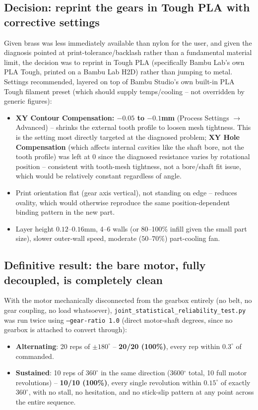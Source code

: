 \documentclass[11pt,letterpaper]{article}
\begin{document}
\subsection{Decision: reprint the gears in Tough PLA with corrective settings}
Given brass was less immediately available than nylon for the user, and given the diagnosis pointed at print-tolerance/backlash rather than a fundamental material limit, the decision was to reprint in Tough PLA (specifically Bambu Lab's own PLA Tough, printed on a Bambu Lab H2D) rather than jumping to metal. Settings recommended, layered on top of Bambu Studio's own built-in PLA Tough filament preset (which should supply temps/cooling -- not overridden by generic figures):
\begin{itemize}
    \item \textbf{XY Contour Compensation: $-0.05$ to $-0.1$mm} (Process Settings $\to$ Advanced) -- shrinks the external tooth profile to loosen mesh tightness. This is the setting most directly targeted at the diagnosed problem; \textbf{XY Hole Compensation} (which affects internal cavities like the shaft bore, not the tooth profile) was left at 0 since the diagnosed resistance varies by rotational position -- consistent with tooth-mesh tightness, not a bore/shaft fit issue, which would be relatively constant regardless of angle.
    \item Print orientation flat (gear axis vertical), not standing on edge -- reduces ovality, which would otherwise reproduce the same position-dependent binding pattern in the new part.
    \item Layer height $0.12$--$0.16$mm, 4--6 walls (or 80--100\% infill given the small part size), slower outer-wall speed, moderate ($50$--$70\%$) part-cooling fan.
\end{itemize}

\subsection{Definitive result: the bare motor, fully decoupled, is completely clean}
\label{sec:bare-motor-exoneration}
With the motor mechanically disconnected from the gearbox entirely (no belt, no gear coupling, no load whatsoever), \texttt{joint\_statistical\_reliability\_test.py} was run twice using \texttt{--gear-ratio 1.0} (direct motor-shaft degrees, since no gearbox is attached to convert through):
\begin{itemize}
    \item \textbf{Alternating}: 20 reps of $\pm180^\circ$ -- \textbf{20/20 (100\%)}, every rep within $0.3^\circ$ of commanded.
    \item \textbf{Sustained}: 10 reps of $360^\circ$ in the same direction (3600$^\circ$ total, 10 full motor revolutions) -- \textbf{10/10 (100\%)}, every single revolution within $0.15^\circ$ of exactly $360^\circ$, with no stall, no hesitation, and no stick-slip pattern at any point across the entire sequence.
\end{itemize}
\end{document}
